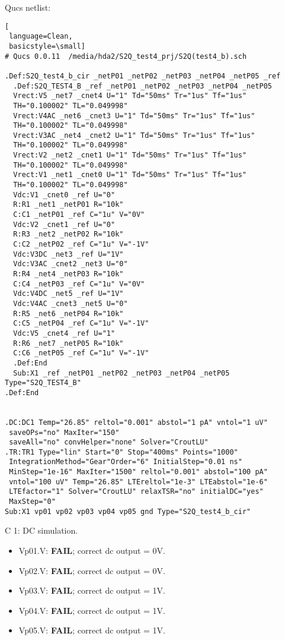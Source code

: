 Qucs netlist:
\begin{lstlisting}[
 language=Clean, 
 basicstyle=\small]
# Qucs 0.0.11  /media/hda2/S2Q_test4_prj/S2Q(test4_b).sch

.Def:S2Q_test4_b_cir _netP01 _netP02 _netP03 _netP04 _netP05 _ref
  .Def:S2Q_TEST4_B _ref _netP01 _netP02 _netP03 _netP04 _netP05
  Vrect:V5 _net7 _cnet4 U="1" Td="50ms" Tr="1us" Tf="1us" 
  TH="0.100002" TL="0.049998"
  Vrect:V4AC _net6 _cnet3 U="1" Td="50ms" Tr="1us" Tf="1us" 
  TH="0.100002" TL="0.049998"
  Vrect:V3AC _net4 _cnet2 U="1" Td="50ms" Tr="1us" Tf="1us" 
  TH="0.100002" TL="0.049998"
  Vrect:V2 _net2 _cnet1 U="1" Td="50ms" Tr="1us" Tf="1us" 
  TH="0.100002" TL="0.049998"
  Vrect:V1 _net1 _cnet0 U="1" Td="50ms" Tr="1us" Tf="1us" 
  TH="0.100002" TL="0.049998"
  Vdc:V1 _cnet0 _ref U="0"
  R:R1 _net1 _netP01 R="10k"
  C:C1 _netP01 _ref C="1u" V="0V"
  Vdc:V2 _cnet1 _ref U="0"
  R:R3 _net2 _netP02 R="10k"
  C:C2 _netP02 _ref C="1u" V="-1V"
  Vdc:V3DC _net3 _ref U="1V"
  Vdc:V3AC _cnet2 _net3 U="0"
  R:R4 _net4 _netP03 R="10k"
  C:C4 _netP03 _ref C="1u" V="0V"
  Vdc:V4DC _net5 _ref U="1V"
  Vdc:V4AC _cnet3 _net5 U="0"
  R:R5 _net6 _netP04 R="10k"
  C:C5 _netP04 _ref C="1u" V="-1V"
  Vdc:V5 _cnet4 _ref U="1"
  R:R6 _net7 _netP05 R="10k"
  C:C6 _netP05 _ref C="1u" V="-1V"
  .Def:End
  Sub:X1 _ref _netP01 _netP02 _netP03 _netP04 _netP05 Type="S2Q_TEST4_B"
.Def:End


.DC:DC1 Temp="26.85" reltol="0.001" abstol="1 pA" vntol="1 uV" 
 saveOPs="no" MaxIter="150"
 saveAll="no" convHelper="none" Solver="CroutLU"
.TR:TR1 Type="lin" Start="0" Stop="400ms" Points="1000" 
 IntegrationMethod="Gear"Order="6" InitialStep="0.01 ns" 
 MinStep="1e-16" MaxIter="1500" reltol="0.001" abstol="100 pA" 
 vntol="100 uV" Temp="26.85" LTEreltol="1e-3" LTEabstol="1e-6" 
 LTEfactor="1" Solver="CroutLU" relaxTSR="no" initialDC="yes" 
 MaxStep="0"
Sub:X1 vp01 vp02 vp03 vp04 vp05 gnd Type="S2Q_test4_b_cir"

\end{lstlisting}
C 1: DC simulation.
\begin{itemize}
 \item Vp01.V: \textbf{FAIL}; correct dc output = 0V.
 \item Vp02.V: \textbf{FAIL}; correct dc output = 0V.
 \item Vp03.V: \textbf{FAIL}; correct dc output = 1V.
 \item Vp04.V: \textbf{FAIL}; correct dc output = 1V.
 \item Vp05.V: \textbf{FAIL}; correct dc output = 1V.
 \end{itemize}

